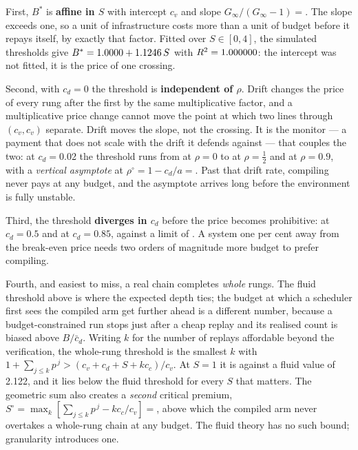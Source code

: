 \documentclass[conference]{IEEEtran}
\theoremstyle{definition}
\begin{document}
First, $B^{*}$ is \textbf{affine in $S$} with intercept $c_v$ and slope
$G_\infty/(G_\infty-1)=$\cbSlopePredicted. The slope exceeds one, so a unit of
infrastructure costs more than a unit of budget before it repays itself, by exactly
that factor. Fitted over $S\in[0,4]$, the simulated thresholds give
$B^{*}=1.0000+1.1246\,S$ with $R^2=1.000000$: the intercept was not
fitted, it is the price of one crossing.

Second, with $c_d=0$ the threshold is \textbf{independent of $\rho$}. Drift changes
the price of every rung after the first by the same multiplicative factor, and a
multiplicative price change cannot move the point at which two lines through
$(c_v,c_v)$ separate. Drift moves the slope, not the crossing. It is the monitor ---
a payment that does not scale with the drift it defends against --- that couples the
two: at $c_d=$\num{0.02} the threshold runs from \cbCritBudgetRhoZero{} at $\rho=0$
to \cbCritBudgetRhoHalf{} at $\rho=\tfrac12$ and \cbCritBudgetRhoNine{} at
$\rho=0.9$, with a \emph{vertical asymptote} at
$\rho^{\circ}=1-c_d/a=$\cbDriftLimit. Past that drift rate, compiling never pays at
any budget, and the asymptote arrives long before the environment is fully unstable.

Third, the threshold \textbf{diverges in $c_d$} before the price becomes
prohibitive: \cbCritBudgetCdHalf{} at $c_d=0.5$ and \cbCritBudgetCdHigh{} at
$c_d=0.85$, against a limit of \cbDetectorLimit. A system one per cent away from the
break-even price needs two orders of magnitude more budget to prefer compiling.

Fourth, and easiest to miss, a real chain completes \emph{whole} rungs. The fluid
threshold above is where the expected depth ties; the budget at which a scheduler
first sees the compiled arm get further ahead is a different number, because a
budget-constrained run stops just after a cheap replay and its realised count is
biased above $B/\bar c_d$. Writing $k$ for the number of replays affordable beyond
the verification, the whole-rung threshold is the smallest $k$ with
$1+\sum_{j\le k}p^{\,j}>(c_v+c_d+S+kc_c)/c_v$. At $S=1$ it is \cbCritBudgetGranular{}
against a fluid value of \num{2.122}, and it lies below the fluid threshold for
every $S$ that matters. The geometric sum also creates a \emph{second} critical
premium, $S^{\circ}=\max_k[\sum_{j\le k}p^{\,j}-kc_c/c_v]=$\cbPremiumLimit, above
which the compiled arm never overtakes a whole-rung chain at any budget. The fluid
theory has no such bound; granularity introduces one.
\end{document}
